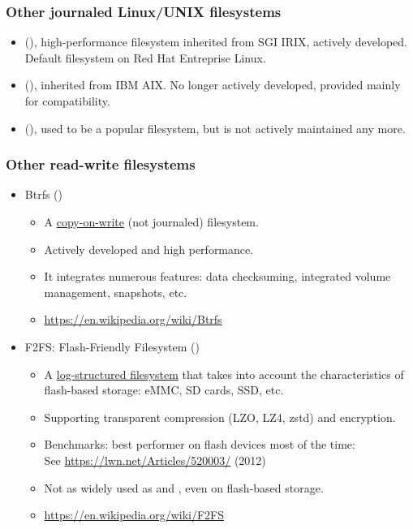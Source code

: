 \begin{frame}
  \frametitle{Other journaled Linux/UNIX filesystems}
  \begin{itemize}
  \item {} (), high-performance filesystem inherited from SGI
    IRIX, actively developed. Default filesystem on Red Hat Entreprise Linux.
  \item {} (), inherited from IBM AIX. No longer actively
    developed, provided mainly for compatibility.
  \item {} (), used to be a
    popular filesystem, but is not actively maintained any more.
  \end{itemize}
\end{frame}

\begin{frame}
  \frametitle{Other read-write filesystems}
  \begin{itemize}
  \item Btrfs ()
    \begin{itemize}
    \item A \href{https://en.wikipedia.org/wiki/Copy-on-write\#In\_computer\_storage}{copy-on-write}
          (not journaled) filesystem.
    \item Actively developed and high performance.
    \item It integrates numerous features: data checksuming, integrated volume management, snapshots, etc.
    \item \url{https://en.wikipedia.org/wiki/Btrfs}
    \end{itemize}
  \item F2FS: Flash-Friendly Filesystem ()
    \begin{itemize}
    \item A \href{https://en.wikipedia.org/wiki/Log-structured\_file\_system}{log-structured filesystem}
          that takes into account the characteristics of flash-based storage: eMMC, SD cards, SSD, etc.
    \item Supporting transparent compression (LZO, LZ4, zstd) and encryption.
    \item Benchmarks: best performer on flash devices most of the time: \\
          See \url{https://lwn.net/Articles/520003/} (2012)
    \item Not as widely used as  and , even on flash-based
          storage.
    \item \url{https://en.wikipedia.org/wiki/F2FS}
    \end{itemize}
  \end{itemize}
\end{frame}

